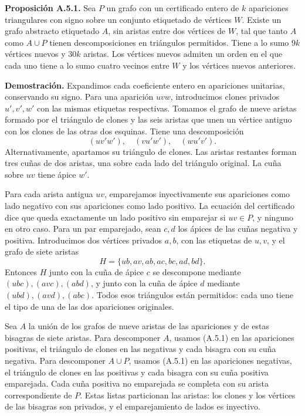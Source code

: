 \documentclass[spanish,11pt,a4paper]{article}
\begin{document}
\textbf{Proposición A.5.1.} Sea \(P\) un grafo con un certificado entero de \(k\) apariciones triangulares con signo sobre un conjunto etiquetado de vértices \(W\). Existe un grafo abstracto etiquetado \(A\), sin aristas entre dos vértices de \(W\), tal que tanto \(A\) como \(A\cup P\) tienen descomposiciones en triángulos permitidos. Tiene a lo sumo \(9k\) vértices nuevos y \(30k\) aristas. Los vértices nuevos admiten un orden en el que cada uno tiene a lo sumo cuatro vecinos entre \(W\) y los vértices nuevos anteriores.

\textbf{Demostración.} Expandimos cada coeficiente entero en apariciones unitarias, conservando su signo. Para una aparición \(uvw\), introducimos clones privados \(u',v',w'\) con las mismas etiquetas respectivas. Tomamos el grafo de nueve aristas formado por el triángulo de clones y las seis aristas que unen un vértice antiguo con los clones de las otras dos esquinas. Tiene una descomposición \[(u v'w'),\quad(v u'w'),\quad(w u'v').
\tag{A.5.1}\] Alternativamente, apartamos su triángulo de clones. Las aristas restantes forman tres cuñas de dos aristas, una sobre cada lado del triángulo original. La cuña sobre \(uv\) tiene ápice \(w'\).

Para cada arista antigua \(uv\), emparejamos inyectivamente sus apariciones como lado negativo con sus apariciones como lado positivo. La ecuación del certificado dice que queda exactamente un lado positivo sin emparejar si \(uv\in P\), y ninguno en otro caso. Para un par emparejado, sean \(c,d\) los ápices de las cuñas negativa y positiva. Introducimos dos vértices privados \(a,b\), con las etiquetas de \(u,v\), y el grafo de siete aristas \[H=\{ub,av,ab,ac,bc,ad,bd\}.\] Entonces \(H\) junto con la cuña de ápice \(c\) se descompone mediante \((ubc),(avc),(abd)\), y junto con la cuña de ápice \(d\) mediante \((ubd),(avd),(abc)\). Todos esos triángulos están permitidos: cada uno tiene el tipo de una de las dos apariciones originales.

Sea \(A\) la unión de los grafos de nueve aristas de las apariciones y de estas bisagras de siete aristas. Para descomponer \(A\), usamos (A.5.1) en las apariciones positivas, el triángulo de clones en las negativas y cada bisagra con su cuña negativa. Para descomponer \(A\cup P\), usamos (A.5.1) en las apariciones negativas, el triángulo de clones en las positivas y cada bisagra con su cuña positiva emparejada. Cada cuña positiva no emparejada se completa con su arista correspondiente de \(P\). Estas listas particionan las aristas: los clones y los vértices de las bisagras son privados, y el emparejamiento de lados es inyectivo.
\end{document}
